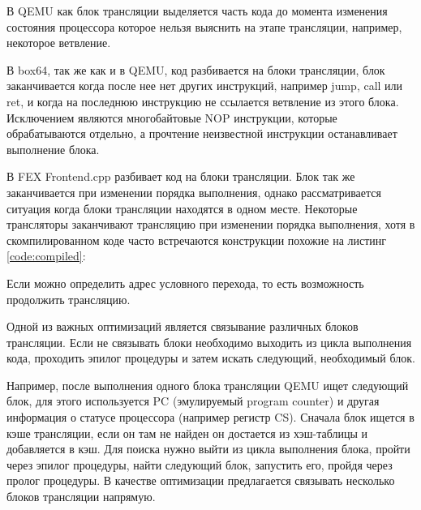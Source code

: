 В QEMU как блок трансляции выделяется часть кода до момента изменения состояния процессора которое нельзя выяснить на этапе трансляции, например, некоторое ветвление. \cite{qemu_docs}

В box64, так же как и в QEMU, код разбивается на блоки трансляции, блок заканчивается когда после нее нет других инструкций, например jump, call или ret, и когда на последнюю инструкцию не ссылается ветвление из этого блока. Исключением являются многобайтовые NOP инструкции, которые обрабатываются отдельно, а прочтение неизвестной инструкции останавливает выполнение блока. \cite{box64_letter}

В FEX Frontend.cpp разбивает код на блоки трансляции. Блок так же заканчивается при изменении порядка выполнения, однако рассматривается ситуация когда блоки трансляции находятся в одном месте. Некоторые трансляторы заканчивают трансляцию при изменении порядка выполнения, хотя в скомпилированном коде часто встречаются конструкции похожие на листинг \ref{code:compiled}:


Если можно определить адрес условного перехода, то есть возможность продолжить трансляцию. \cite{fex_front}

Одной из важных оптимизаций является связывание различных блоков трансляции. Если не связывать блоки необходимо выходить из цикла выполнения кода, проходить эпилог процедуры и затем искать следующий, необходимый блок.

Например, после выполнения одного блока трансляции QEMU ищет следующий блок, для этого используется PC (эмулируемый program counter) и другая информация о статусе процессора (например регистр CS). Сначала блок ищется в кэше трансляции, если он там не найден он достается из хэш-таблицы и добавляется в кэш. Для поиска нужно выйти из цикла выполнения блока, пройти через эпилог процедуры, найти следующий блок, запустить его, пройдя через пролог процедуры. В качестве оптимизации предлагается связывать несколько блоков трансляции напрямую.

